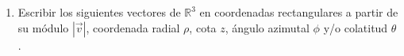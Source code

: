 \documentclass[a4paper]{article}
\newcommand{\answer}{\item[**]}
\newcommand{\exercise}{\item}
\newcommand{\SEL}[1]{ \left\{\begin{matrix} #1 \end{matrix}\right. }
\newcommand{\df}[2]{\displaystyle\frac{#1}{#2}}
\newcommand{\degs}{^{\circ}}
\begin{document}
\begin{enumerate}
\begin{multicols}{2}
\begin{enumerate} [label=(\alph*)]
		\item $(2,3,4)$
		\answer $|\vec{v}| = \sqrt{2^2+3^2+4^2} = \sqrt{29}$. $\rho = \sqrt{2^2+3^2} = \sqrt{13}$. $\phi = \arctan\left(\df{3}{2}\right) \simeq 56.31\degs$. $\theta = \arccos\left(\df{4}{\sqrt{29}}\right) \simeq 42.03\degs$. \\ Cilindricas: $\SEL{v_x \simeq \sqrt{13} \cos{56\degs} \\ v_y \simeq \sqrt{13} \sin{56\degs} \\ v_z=4 }$. Esféricas: $\SEL{v_x \simeq \sqrt{29} \sin{42\degs} \cos{56\degs} \\ v_y \simeq \sqrt{29} \sin{42\degs} \sin{56\degs} \\ v_z \simeq \sqrt{29} \cos{42\degs} }$

		\item $(3,-4,0)$
		\answer $|\vec{v}| = \sqrt{3^2+(-4)^2+0^2} = 5$. $\rho = \sqrt{3^2+(-4)^2} = 5$. $\phi = \arctan\left(\df{-4}{3}\right) \simeq -53.13\degs$. $\theta = \arccos\left(\df{0}{5}\right) = 90\degs$. \\ Cilindricas: $\SEL{v_x \simeq 5 \cos{-53\degs} \\ v_y \simeq 5 \sin{-53\degs} \\ v_z=0 }$. Esféricas: $\SEL{v_x \simeq 5 \sin{90\degs} \cos{-53\degs} \\ v_y \simeq 5 \sin{90\degs} \sin{-53\degs} \\ v_z \simeq 5 \cos{90\degs} }$

		\item $(0,5,0)$
		\answer $|\vec{v}| = \sqrt{0^2+5^2+0^2} = 5$. $\rho = \sqrt{0^2+5^2} = 5$. $\phi = 90\degs$. $\theta = \arccos\left(\df{0}{5}\right) = 90\degs$. \\ Cilindricas: $\SEL{v_x=5 \cos{90\degs} \\ v_y=5 \sin{90\degs} \\ v_z=0 }$. Esféricas: $\SEL{v_x \simeq 5 \sin{90\degs} \cos{90\degs} \\ v_y \simeq 5 \sin{90\degs} \sin{90\degs} \\ v_z \simeq 5 \cos{90\degs} }$

	\end{enumerate}
	\end{multicols}

	\exercise Escribir los siguientes vectores de $\mathbb{R}^3$ en coordenadas rectangulares a partir de su módulo $|\vec{v}|$, coordenada radial $\rho$, cota $z$, ángulo azimutal $\phi$ y/o colatitud $\theta$.
	\begin{multicols}{2}
	\begin{enumerate} [label=(\alph*)]
		

\end{enumerate}
\end{multicols}
\end{enumerate}
\end{document}
